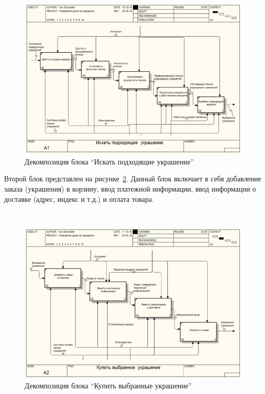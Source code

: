  ~
\begin{figure}[H]
\centering
	\includegraphics[scale=0.45]{figures/functionalModel/a1_search.png}
	\caption{Декомпозиция блока \enquote{Искать подходящие украшение}}
	\label{fig:analysis:functionalModel:a1_search}
\end{figure}

Второй блок представлен на рисунке~\ref{fig:analysis:functionalModel:a2_buy}. Данный блок включает в себя добавление заказа (украшения) в корзину, ввод платежной информации, ввод информации о доставке (адрес, индекс и т.д.) и оплата товара.

 ~
\begin{figure}[H]
\centering
	\includegraphics[scale=0.45]{figures/functionalModel/a2_buy.png}
	\caption{Декомпозиция блока \enquote{Купить выбранные украшение}}
	\label{fig:analysis:functionalModel:a2_buy}
\end{figure}

